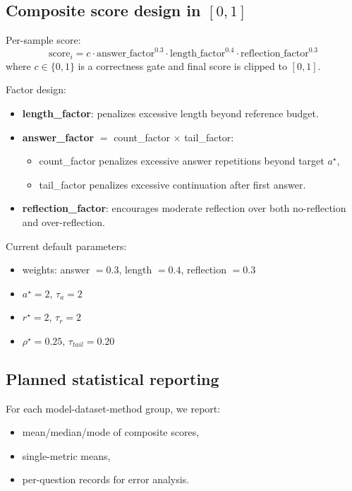 \documentclass[11pt]{article}
\begin{document}
\subsection{Composite score design in $[0,1]$}

Per-sample score:
\[
\text{score}_i = c \cdot \text{answer\_factor}^{0.3} \cdot \text{length\_factor}^{0.4} \cdot \text{reflection\_factor}^{0.3}
\]
where $c \in \{0,1\}$ is a correctness gate and final score is clipped to $[0,1]$.

Factor design:
\begin{itemize}[leftmargin=*]
    \item \textbf{length\_factor}: penalizes excessive length beyond reference budget.
    \item \textbf{answer\_factor} $=$ count\_factor $\times$ tail\_factor:
    \begin{itemize}[leftmargin=*]
        \item count\_factor penalizes excessive answer repetitions beyond target $a^\star$,
        \item tail\_factor penalizes excessive continuation after first answer.
    \end{itemize}
    \item \textbf{reflection\_factor}: encourages moderate reflection over both no-reflection and over-reflection.
\end{itemize}

Current default parameters:
\begin{itemize}[leftmargin=*]
    \item weights: answer $= 0.3$, length $= 0.4$, reflection $= 0.3$
    \item $a^\star = 2$, $\tau_a = 2$
    \item $r^\star = 2$, $\tau_r = 2$
    \item $\rho^\star = 0.25$, $\tau_{tail} = 0.20$
\end{itemize}

\subsection{Planned statistical reporting}

For each model-dataset-method group, we report:
\begin{itemize}[leftmargin=*]
    \item mean/median/mode of composite scores,
    \item single-metric means,
    \item per-question records for error analysis.
\end{itemize}
\end{document}
